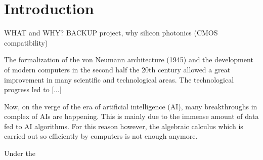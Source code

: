 \chapter*{Introduction}

WHAT and WHY?
BACKUP project, why silicon photonics (CMOS compatibility)
\vspace*{2em}

The formalization of the von Neumann architecture (1945) and the development of modern computers in the second half the 20th century allowed a great improvement in many scientific and technological areas.
The technological progress led to [...]

\vspace*{2em}
Now, on the verge of the era of artificial intelligence (AI), many breakthroughs in complex of AIs are happening.
This is mainly due to the immense amount of data fed to AI algorithms.
For this reason however, the algebraic calculus which is carried out so efficiently by computers is not enough anymore.

\vspace*{2em}
Under the